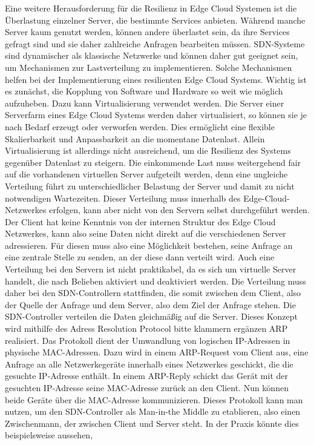 Eine weitere Herausforderung für die Resilienz in Edge Cloud Systemen ist die Überlastung einzelner Server, die bestimmte Services anbieten. Während manche Server kaum genutzt werden, können andere überlastet sein, 
da ihre Services gefragt sind und sie daher zahlreiche Anfragen bearbeiten müssen. SDN-Systeme sind dynamischer als klassische Netzwerke und können daher gut geeignet sein, 
um Mechanismen zur Lastverteilung zu implementieren. Solche Mechanismen helfen bei der Implementierung eines resilienten Edge Cloud Systems. Wichtig ist es zunächst, 
die Kopplung von Software und Hardware so weit wie möglich aufzuheben. Dazu kann Virtualisierung verwendet werden. Die Server einer Serverfarm eines Edge Cloud Systems werden daher virtualisiert, 
so können sie je nach Bedarf erzeugt oder verworfen werden. Dies ermöglicht eine flexible Skalierbarkeit und Anpassbarkeit an die momentane Datenlast. Allein Virtualisierung ist allerdings nicht ausreichend, 
um die Resilienz des Systems gegenüber Datenlast zu steigern. Die einkommende Last muss weitergehend fair auf die vorhandenen virtuellen Server aufgeteilt werden, 
denn eine ungleiche Verteilung führt zu unterschiedlicher Belastung der Server und damit zu nicht notwendigen Wartezeiten. Dieser Verteilung muss innerhalb des Edge-Cloud-Netzwerkes erfolgen, 
kann aber nicht von den Servern selbst durchgeführt werden. Der Client hat keine Kenntnis von der internen Struktur des Edge Cloud Netzwerkes, kann also seine Daten nicht direkt auf die verschiedenen Server adressieren. 
Für diesen muss also eine Möglichkeit bestehen, seine Anfrage an eine zentrale Stelle zu senden, an der diese dann verteilt wird. Auch eine Verteilung bei den Servern ist nicht praktikabel, 
da es sich um virtuelle Server handelt, die nach Belieben aktiviert und deaktiviert werden. Die Verteilung muss daher bei den SDN-Controllern stattfinden, die somit zwischen dem Client, 
also der Quelle der Anfrage und dem Server, also dem Ziel der Anfrage stehen. Die SDN-Controller verteilen die Daten gleichmäßig auf die Server. Dieses Konzept wird mithilfe des Adress Resolution Protocol bitte klammern ergänzen ARP realisiert. 
Das Protokoll dient der Umwandlung von logischen IP-Adressen in physische MAC-Adressen. Dazu wird in einem ARP-Request vom Client aus, eine Anfrage an alle Netzwerkegeräte innerhalb eines Netzwerkes geschickt, 
die die gesuchte IP-Adresse enthält. In einem ARP-Reply schickt das Gerät mit der gesuchten IP-Adresse seine MAC-Adresse zurück an den Client. Nun können beide Geräte über die MAC-Adresse kommunizieren. 
Dieses Protokoll kann man nutzen, um den SDN-Controller als Man-in-the Middle zu etablieren, also einen Zwischenmann, der zwischen Client und Server steht. In der Praxis könnte dies beispielsweise aussehen, 
